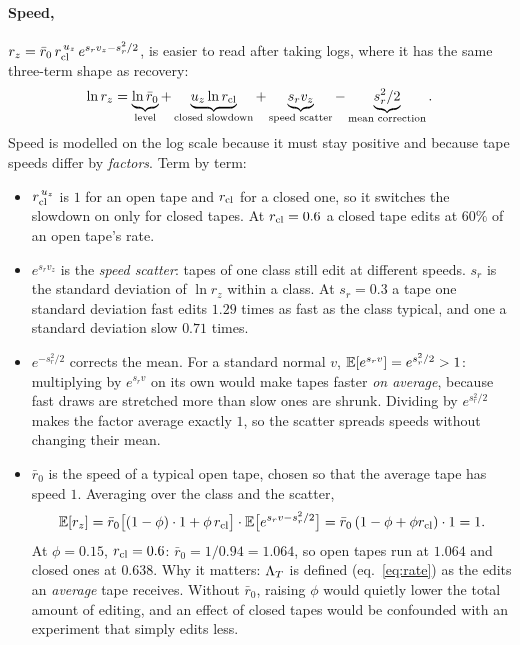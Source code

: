 \paragraph{Speed,} $r_z=\bar r_0\,r_{\rm cl}^{\,u_z}\,e^{s_rv_z-s_r^2/2}$, is easier to read after
taking logs, where it has the same three-term shape as recovery:
\begin{equation}
  \ln r_z=\underbrace{\ln\bar r_0}_{\text{level}}
  +\underbrace{u_z\ln r_{\rm cl}}_{\text{closed slowdown}}
  +\underbrace{s_rv_z}_{\text{speed scatter}}
  -\underbrace{s_r^2/2}_{\text{mean correction}} .
  \label{eq:lnr}
\end{equation}
Speed is modelled on the log scale because it must stay positive and because tape speeds differ by
\emph{factors}. Term by term:
\begin{itemize}
  \item $r_{\rm cl}^{\,u_z}$ is $1$ for an open tape and $r_{\rm cl}$ for a closed one, so it switches
        the slowdown on only for closed tapes. At $r_{\rm cl}=0.6$ a closed tape edits at $60\%$ of an
        open tape's rate.
  \item $e^{s_rv_z}$ is the \emph{speed scatter}: tapes of one class still edit at different speeds.
        $s_r$ is the standard deviation of $\ln r_z$ within a class. At $s_r=0.3$ a tape one standard
        deviation fast edits $1.29$ times as fast as the class typical, and one a standard deviation slow
        $0.71$ times.
  \item $e^{-s_r^2/2}$ corrects the mean. For a standard normal $v$, $\mathbb{E}[e^{s_rv}]=e^{s_r^2/2}>1$:
        multiplying by $e^{s_rv}$ on its own would make tapes faster \emph{on average}, because fast
        draws are stretched more than slow ones are shrunk. Dividing by $e^{s_r^2/2}$ makes the factor
        average exactly $1$, so the scatter spreads speeds without changing their mean.
  \item $\bar r_0$ is the speed of a typical open tape, chosen so that the average tape has speed $1$.
        Averaging over the class and the scatter,
        \begin{equation}
          \mathbb{E}[r_z]=\bar r_0\big[(1-\phi)\cdot1+\phi\,r_{\rm cl}\big]\cdot\mathbb{E}\big[e^{s_rv-s_r^2/2}\big]
          =\bar r_0\,(1-\phi+\phi r_{\rm cl})\cdot1=1 .
          \label{eq:Er}
        \end{equation}
        At $\phi=0.15$, $r_{\rm cl}=0.6$: $\bar r_0=1/0.94=1.064$, so open tapes run at $1.064$ and closed
        ones at $0.638$. Why it matters: $\Lambda_T$ is defined (eq.~\ref{eq:rate}) as the edits an
        \emph{average} tape receives. Without $\bar r_0$, raising $\phi$ would quietly lower the total
        amount of editing, and an effect of closed tapes would be confounded with an experiment that
        simply edits less.
\end{itemize}

